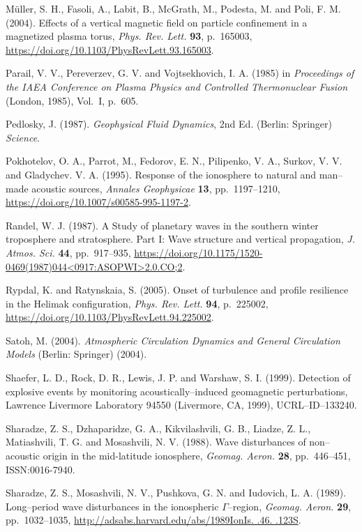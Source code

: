\documentclass[a4paper,openany,12pt]{report}
\begin{document}
\begin{thebibliography}{100}
\bibitem{}
M\"uller, S. H., Fasoli, A., Labit, B., McGrath, M., Podesta, M. and Poli, F. M. (2004). Effects of a vertical magnetic field on particle confinement in a magnetized plasma torus, {\it Phys. Rev. Lett.} \textbf{93}, p.~165003, 
\url{https://doi.org/10.1103/PhysRevLett.93.165003}.

\bibitem{}
Parail, V. V., Pereverzev, G. V. and Vojtsekhovich, I. A. (1985) in {\it Proceedings of the IAEA Conference on Plasma Physics and Controlled Thermonuclear Fusion} (London, 1985), Vol.~I, p.~605.

\bibitem{}
Pedlosky, J. (1987). \emph{Geophysical Fluid Dynamics}, 2nd Ed. (Berlin: Springer) \emph{Science}.

\bibitem{}
Pokhotelov, O. A., Parrot, M., Fedorov, E. N., Pilipenko, V. A., Surkov, V. V. and Gladychev. V. A. (1995). Response of the ionosphere to natural and man--made acoustic sources, \emph{Annales Geophysicae} \textbf{13}, pp.~1197--1210, \url{https://doi.org/10.1007/s00585-995-1197-2}.

\bibitem{}
Randel, W. J. (1987). A Study of planetary waves in the southern winter troposphere and stratosphere. Part I: Wave structure and vertical propagation, {\it J. Atmos. Sci.} \textbf{44}, pp.~917--935, \url{https://doi.org/10.1175/1520-0469(1987)044<0917:ASOPWI>2.0.CO;2}.
 
\bibitem{}
Rypdal, K. and Ratynskaia, S. (2005). Onset of turbulence and profile resilience in the Helimak configuration, {\it Phys. Rev. Lett.} \textbf{94}, p.~225002, \url{https://doi.org/10.1103/PhysRevLett.94.225002}.

\bibitem{}
Satoh, M. (2004). {\it Atmospheric Circulation Dynamics and General Circulation Models} (Berlin: Springer) (2004).

\bibitem{}
Shaefer, L. D., Rock, D. R., Lewis, J. P. and Warshaw, S. I. (1999). Detection of explosive events by monitoring acoustically--induced geomagnetic perturbations, Lawrence Livermore Laboratory 94550 (Livermore, CA, 1999), UCRL--ID--133240.

\bibitem{}
Sharadze, Z. S., Dzhaparidze, G. A., Kikvilashvili, G. B., Liadze, Z. L., Matiashvili, T. G. and Mosashvili, N. V. (1988). Wave disturbances of non--acoustic origin in the mid-latitude ionosphere, {\it Geomag. Aeron.} \textbf{28}, pp.~446--451, ISSN:0016-7940.

\bibitem{}
Sharadze, Z. S., Mosashvili, N. V., Pushkova, G. N. and Iudovich, L. A. (1989). Long--period wave disturbances in the ionospheric $\Gamma$--region, {\it Geomag. Aeron.} \textbf{29}, pp.~1032--1035, \url{http://adsabs.harvard.edu/abs/1989IonIs. .46. .123S}.


\end{thebibliography}
\end{document}
